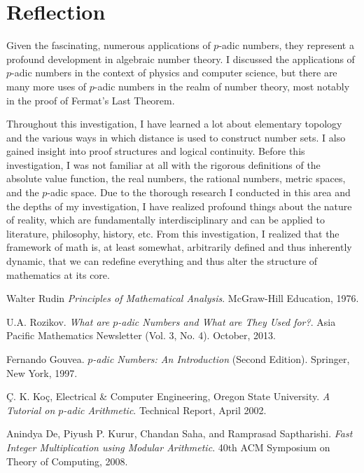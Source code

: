 \documentclass[a4paper]{article}
\begin{document}
\section{Reflection}

Given the fascinating, numerous applications of $p$-adic numbers, they represent a profound development in algebraic number theory. I discussed the applications of $p$-adic numbers in the context of physics and computer science, but there are many more uses of $p$-adic numbers in the realm of number theory, most notably in the proof of Fermat's Last Theorem. 

Throughout this investigation, I have learned a lot about elementary topology and the various ways in which distance is used to construct number sets. I also gained insight into proof structures and logical continuity. Before this investigation, I was not familiar at all with the rigorous definitions of the absolute value function, the real numbers, the rational numbers, metric spaces, and the $p$-adic space. Due to the thorough research I conducted in this area and the depths of my investigation, I have realized profound things about the nature of reality, which are fundamentally interdisciplinary and can be applied to literature, philosophy, history, etc. From this investigation, I realized that the framework of math is, at least somewhat, arbitrarily defined and thus inherently dynamic, that we can redefine everything and thus alter the structure of mathematics at its core. 




\medskip
 
\begin{thebibliography}{5}

Walter Rudin \textit{Principles of Mathematical Analysis}. McGraw-Hill Education, 1976.

U.A. Rozikov. \textit{What are $p$-adic Numbers and What are They Used for?}. Asia Pacific Mathematics Newsletter (Vol. 3, No. 4). October, 2013.

Fernando Gouvea. \textit{$p$-adic Numbers: An Introduction} (Second Edition). Springer, New York, 1997. 

\c{C}. K. Ko\c{c}, Electrical \& Computer Engineering, Oregon State University. \textit{A Tutorial on $p$-adic Arithmetic}. Technical Report, April 2002. 

Anindya De, Piyush P. Kurur, Chandan Saha, and Ramprasad Saptharishi. \textit{Fast Integer Multiplication using Modular Arithmetic}. 40th ACM Symposium on Theory of Computing, 2008.




\end{thebibliography}
\end{document}
